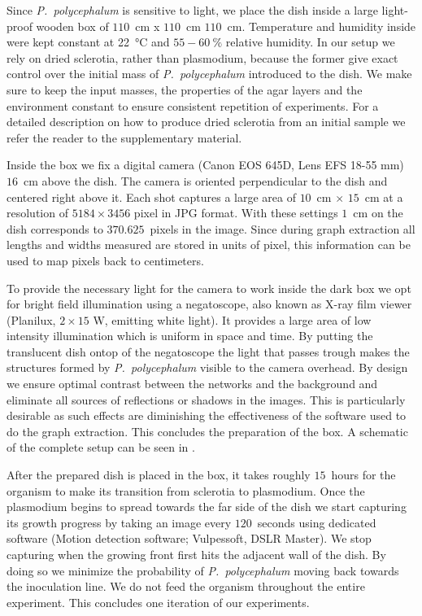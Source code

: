 	      Since \emph{P.~polycephalum} is sensitive to light, we place the dish inside a large light-proof wooden box of $110$~cm x $110$~cm $110$~cm. Temperature and humidity inside were kept constant at \SI{22}{\celsius} and $55-60 \ \%$ relative humidity. In our setup we rely on dried sclerotia, rather than plasmodium, because the former give exact control over the initial mass of \emph{P.~polycephalum} introduced to the dish. We make sure to keep the input masses, the properties of the agar layers and the environment constant to ensure consistent repetition of experiments. For a detailed description on how to produce dried sclerotia from an initial sample we refer the reader to the supplementary material.

	      Inside the box we fix a digital camera (Canon EOS 645D, Lens EFS 18-55 mm) $16$~cm above the dish. The camera is oriented perpendicular to the dish and centered right above it. Each shot captures a large area of $10$~cm $\times$ $15$~cm at a resolution of $5184 \times 3456$ pixel in JPG format. With these settings $1$~cm on the dish corresponds to $370.625$~pixels in the image. Since during graph extraction all lengths and widths measured are stored in units of pixel, this information can be used to map pixels back to centimeters.

	      To provide the necessary light for the camera to work inside the dark box we opt for bright field illumination using a negatoscope, also known as X-ray film viewer (Planilux, $2 \times 15$ W, emitting white light). It provides a large area of low intensity illumination which is uniform in space and time. By putting the translucent dish ontop of the negatoscope the light that passes trough makes the structures formed by \emph{P.~polycephalum} visible to the camera overhead. By design we ensure optimal contrast between the networks and the background and eliminate all sources of reflections or shadows in the images. This is particularly desirable as such effects are diminishing the effectiveness of the software used to do the graph extraction. This concludes the preparation of the box. A schematic of the complete setup can be seen in .

	      After the prepared dish is placed in the box, it takes roughly $15$~hours for the organism to make its transition from sclerotia to plasmodium. Once the plasmodium begins to spread towards the far side of the dish we start capturing its growth progress by taking an image every $120$~seconds using dedicated software (Motion detection software; Vulpessoft, DSLR Master). We stop capturing when the growing front first hits the adjacent wall of the dish. By doing so we minimize the probability of \emph{P.~polycephalum} moving back towards the inoculation line. We do not feed the organism throughout the entire experiment. This concludes one iteration of our experiments.

